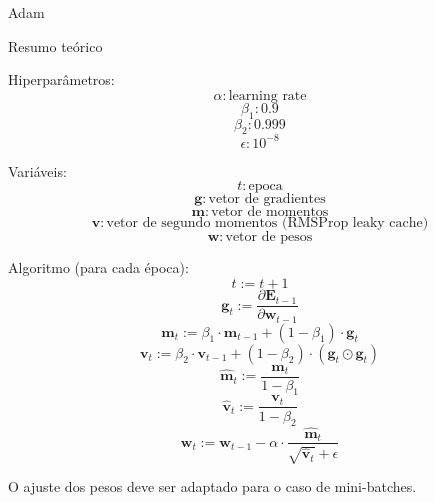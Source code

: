 \documentclass{article}
\begin{document}
\centerline{\sc \large Adam}
\vspace{.5pc}
\centerline{\sc Resumo teórico}
\vspace{4pc}

Hiperparâmetros:
\[ \alpha: \textrm{learning rate}  \]
\[ \beta_1: 0.9 \]
\[ \beta_2: 0.999 \]
\[ \epsilon: 10^{-8} \]
\vspace{3pc}

Variáveis:
\[ t: \textrm{epoca} \]
\[ \mathbf{g}: \textrm{vetor de gradientes} \]
\[ \mathbf{m}: \textrm{vetor de momentos} \]
\[ \mathbf{v}: \textrm{vetor de segundo momentos (RMSProp leaky cache)} \]
\[ \mathbf{w}: \textrm{vetor de pesos} \]
\vspace{3pc}

Algoritmo (para cada época):
\[ t := t + 1 \]
\[ \mathbf{g}_t := \frac{\partial \mathbf{E}_{t-1}}{\partial \mathbf{w}_{t-1}} \]
\[ \mathbf{m}_t := \beta_1 \cdot \mathbf{m}_{t-1} + (1 - \beta_1) \cdot \mathbf{g}_t \]
\[ \mathbf{v}_t := \beta_2 \cdot \mathbf{v}_{t-1} + (1 - \beta_2) \cdot (\mathbf{g}_t \odot \mathbf{g}_t) \]
\[ \mathbf{\hat{m}}_t := \frac{\mathbf{m}_t}{1 - \beta_1} \]
\[ \mathbf{\hat{v}}_t := \frac{\mathbf{v}_t}{1 - \beta_2} \]
\[ \mathbf{w}_t := \mathbf{w}_{t-1} - \alpha \cdot \frac{\mathbf{\hat{m}}_t}{\sqrt{\mathbf{\hat{v}}_t} + \epsilon} \]
\vspace{3pc}

O ajuste dos pesos deve ser adaptado para o caso de mini-batches.
\end{document}
